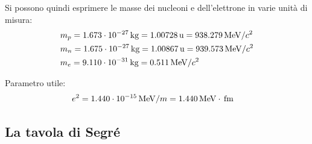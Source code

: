 Si possono quindi esprimere le masse dei nucleoni e dell'elettrone in varie unità di misura:
\begin{equation*}
	\begin{split}
		&m_p = 1.673\cdot10^{-27}\,\text{kg} = 1.00728\,\text{u} = 938.279 \,\mathrm{MeV}/c^2\\
		&m_n = 1.675\cdot10^{-27}\,\text{kg} = 1.00867\,\text{u} = 939.573 \,\mathrm{MeV}/c^2\\
		&m_e = 9.110\cdot10^{-31}\,\text{kg} = 0.511\,\mathrm{MeV}/c^2
	\end{split}
\end{equation*}

Parametro utile:
\begin{equation*}
	\begin{split}
		&e^2 = 1.440 \cdot 10^{-15} \,\mathrm{MeV}/m = 1.440 \,\mathrm{MeV}\cdot \,\mathrm{fm}
	\end{split}
\end{equation*}

\subsection{La tavola di Segré}

